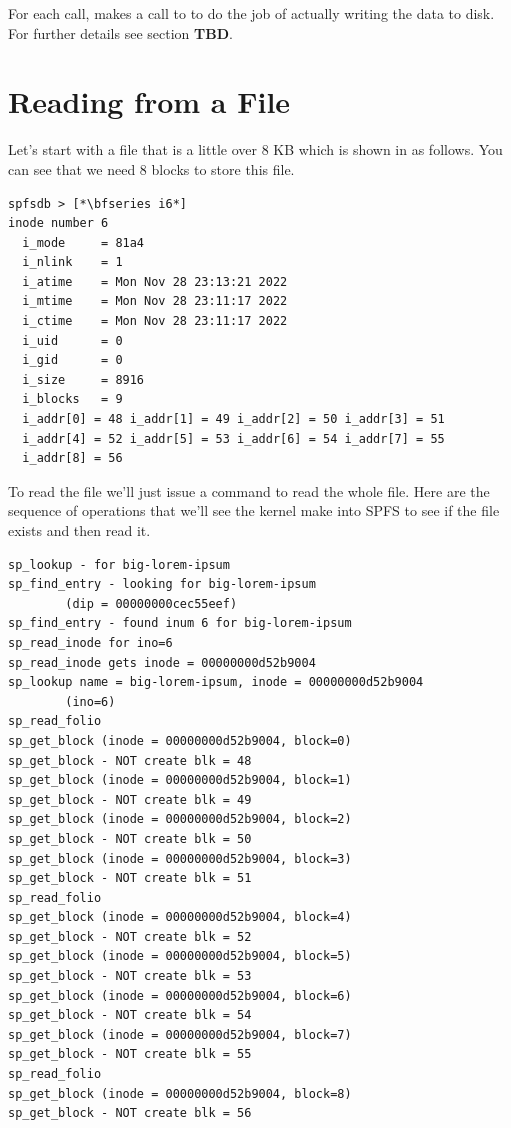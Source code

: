 \noindent
For each call,  makes a call to  to do the job of actually writing the data to disk. For further details see section \textbf{TBD}.


\section{Reading from a File}

Let's start with a file that is a little over 8 KB which is shown in  as follows. You can see that we need 8 blocks to store this file.

\begin{lstlisting}
spfsdb > [*\bfseries i6*]
inode number 6
  i_mode     = 81a4
  i_nlink    = 1
  i_atime    = Mon Nov 28 23:13:21 2022
  i_mtime    = Mon Nov 28 23:11:17 2022
  i_ctime    = Mon Nov 28 23:11:17 2022
  i_uid      = 0
  i_gid      = 0
  i_size     = 8916
  i_blocks   = 9
  i_addr[0] = 48 i_addr[1] = 49 i_addr[2] = 50 i_addr[3] = 51
  i_addr[4] = 52 i_addr[5] = 53 i_addr[6] = 54 i_addr[7] = 55
  i_addr[8] = 56
\end{lstlisting}

\noindent
To read the file we'll just issue a  command to read the whole file. Here are the sequence of operations that we'll see the kernel make into SPFS to see if the file exists and then read it.

\begin{lstlisting}
sp_lookup - for big-lorem-ipsum
sp_find_entry - looking for big-lorem-ipsum 
        (dip = 00000000cec55eef)
sp_find_entry - found inum 6 for big-lorem-ipsum
sp_read_inode for ino=6
sp_read_inode gets inode = 00000000d52b9004
sp_lookup name = big-lorem-ipsum, inode = 00000000d52b9004 
        (ino=6)
sp_read_folio
sp_get_block (inode = 00000000d52b9004, block=0)
sp_get_block - NOT create blk = 48
sp_get_block (inode = 00000000d52b9004, block=1)
sp_get_block - NOT create blk = 49
sp_get_block (inode = 00000000d52b9004, block=2)
sp_get_block - NOT create blk = 50
sp_get_block (inode = 00000000d52b9004, block=3)
sp_get_block - NOT create blk = 51
sp_read_folio
sp_get_block (inode = 00000000d52b9004, block=4)
sp_get_block - NOT create blk = 52
sp_get_block (inode = 00000000d52b9004, block=5)
sp_get_block - NOT create blk = 53
sp_get_block (inode = 00000000d52b9004, block=6)
sp_get_block - NOT create blk = 54
sp_get_block (inode = 00000000d52b9004, block=7)
sp_get_block - NOT create blk = 55
sp_read_folio
sp_get_block (inode = 00000000d52b9004, block=8)
sp_get_block - NOT create blk = 56
\end{lstlisting}

